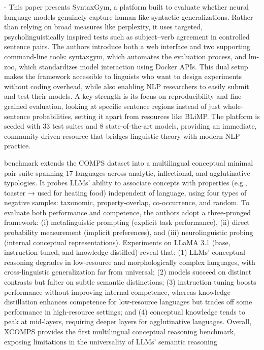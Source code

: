 \documentclass[acmsmall]{acmart}
\begin{document}
\citep{gauthier2020syntaxgym}- This paper presents SyntaxGym, a platform built to evaluate whether neural language models genuinely capture human-like syntactic generalizations. Rather than relying on broad measures like perplexity, it uses targeted, psycholinguistically inspired tests such as subject–verb agreement in controlled sentence pairs. The authors introduce both a web interface and two supporting command-line tools: syntaxgym, which automates the evaluation process, and lm-zoo, which standardizes model interaction using Docker APIs. This dual setup makes the framework accessible to linguists who want to design experiments without coding overhead, while also enabling NLP researchers to easily submit and test their models. A key strength is its focus on reproducibility and fine-grained evaluation, looking at specific sentence regions instead of just whole-sentence probabilities, setting it apart from resources like BLiMP. The platform is seeded with 33 test suites and 8 state-of-the-art models, providing an immediate, community-driven resource that bridges linguistic theory with modern NLP practice.

\citep{unknown} benchmark extends the COMPS dataset into a multilingual conceptual minimal pair suite spanning 17 languages across analytic, inflectional, and agglutinative typologies. It probes LLMs’ ability to associate concepts with properties (e.g., toaster → used for heating food) independent of language, using four types of negative samples: taxonomic, property-overlap, co-occurrence, and random. To evaluate both performance and competence, the authors adopt a three-pronged framework: (i) metalinguistic prompting (explicit task performance), (ii) direct probability measurement (implicit preferences), and (iii) neurolinguistic probing (internal conceptual representations). Experiments on LLaMA 3.1 (base, instruction-tuned, and knowledge-distilled) reveal that: (1) LLMs’ conceptual reasoning degrades in low-resource and morphologically complex languages, with cross-linguistic generalization far from universal; (2) models succeed on distinct contrasts but falter on subtle semantic distinctions; (3) instruction tuning boosts performance without improving internal competence, whereas knowledge distillation enhances competence for low-resource languages but trades off some performance in high-resource settings; and (4) conceptual knowledge tends to peak at mid-layers, requiring deeper layers for agglutinative languages. Overall, XCOMPS provides the first multilingual conceptual reasoning benchmark, exposing limitations in the universality of LLMs’ semantic reasoning
\end{document}
